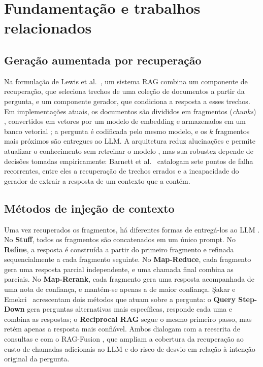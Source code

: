 \section{Fundamentação e trabalhos relacionados}
\label{sc:fundamentacao}

\subsection{Geração aumentada por recuperação}

Na formulação de Lewis et al.~\cite{lewis2020rag}, um sistema RAG combina um componente de recuperação, que seleciona trechos de uma coleção de documentos a partir da pergunta, e um componente gerador, que condiciona a resposta a esses trechos. Em implementações atuais, os documentos são divididos em fragmentos (\emph{chunks}) \cite{schwaber2025chunking}, convertidos em vetores por um modelo de embedding e armazenados em um banco vetorial \cite{ma2024vectorsurvey}; a pergunta é codificada pelo mesmo modelo, e os $k$ fragmentos mais próximos são entregues ao LLM. A arquitetura reduz alucinações e permite atualizar o conhecimento sem retreinar o modelo \cite{andriopoulos2023augmenting}, mas sua robustez depende de decisões tomadas empiricamente: Barnett et al.~\cite{barnett2024seven} catalogam sete pontos de falha recorrentes, entre eles a recuperação de trechos errados e a incapacidade do gerador de extrair a resposta de um contexto que a contém.

\subsection{Métodos de injeção de contexto}

Uma vez recuperados os fragmentos, há diferentes formas de entregá-los ao LLM \cite{topsakal2023langchain}. No \textbf{Stuff}, todos os fragmentos são concatenados em um único prompt. No \textbf{Refine}, a resposta é construída a partir do primeiro fragmento e refinada sequencialmente a cada fragmento seguinte. No \textbf{Map-Reduce}, cada fragmento gera uma resposta parcial independente, e uma chamada final combina as parciais. No \textbf{Map-Rerank}, cada fragmento gera uma resposta acompanhada de uma nota de confiança, e mantém-se apenas a de maior confiança. Şakar e Emekci~\cite{sakar2025rag} acrescentam dois métodos que atuam sobre a pergunta: o \textbf{Query Step-Down} gera perguntas alternativas mais específicas, responde cada uma e combina as respostas; o \textbf{Reciprocal RAG} segue o mesmo primeiro passo, mas retém apenas a resposta mais confiável. Ambos dialogam com a reescrita de consultas \cite{ma2023query} e com o RAG-Fusion \cite{rackauckas2024ragfusion}, que ampliam a cobertura da recuperação ao custo de chamadas adicionais ao LLM e do risco de desvio em relação à intenção original da pergunta.

